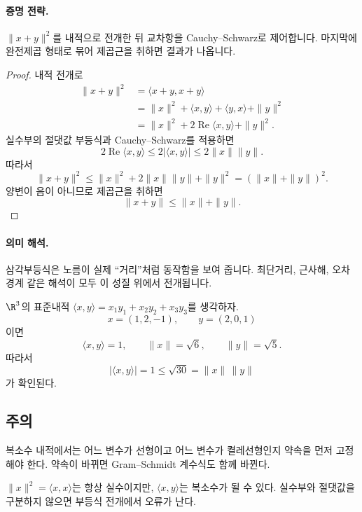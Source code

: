 \paragraph{증명 전략.}
$\|x+y\|^2$를 내적으로 전개한 뒤 교차항을 Cauchy--Schwarz로 제어합니다. 마지막에 완전제곱 형태로 묶어 제곱근을 취하면 결과가 나옵니다.

\begin{proof}
내적 전개로
\begin{align*}
\|x+y\|^2
&=\langle x+y,x+y\rangle\\
&=\|x\|^2+\langle x,y\rangle+\langle y,x\rangle+\|y\|^2\\
&=\|x\|^2+2\operatorname{Re}\langle x,y\rangle+\|y\|^2.
\end{align*}
실수부의 절댓값 부등식과 Cauchy--Schwarz를 적용하면
$$
2\operatorname{Re}\langle x,y\rangle
\le 2|\langle x,y\rangle|
\le 2\|x\|\|y\|.
$$
따라서
$$
\|x+y\|^2\le \|x\|^2+2\|x\|\|y\|+\|y\|^2=(\|x\|+\|y\|)^2.
$$
양변이 음이 아니므로 제곱근을 취하면
$$
\|x+y\|\le \|x\|+\|y\|.
$$
\end{proof}

\paragraph{의미 해석.}
삼각부등식은 노름이 실제 ``거리''처럼 동작함을 보여 줍니다. 최단거리, 근사해, 오차경계 같은 해석이 모두 이 성질 위에서 전개됩니다.

\begin{example}
$\R^3$의 표준내적 $\langle x,y\rangle=x_1y_1+x_2y_2+x_3y_3$를 생각하자.
$$
x=(1,2,-1),\qquad y=(2,0,1)
$$
이면
$$
\langle x,y\rangle=1,\qquad
\|x\|=\sqrt6,\qquad
\|y\|=\sqrt5.
$$
따라서
$$
|\langle x,y\rangle|=1\le \sqrt{30}=\|x\|\,\|y\|
$$
가 확인된다.
\end{example}

\subsection*{주의}
\begin{warning}
복소수 내적에서는 어느 변수가 선형이고 어느 변수가 켤레선형인지 약속을 먼저 고정해야 한다. 약속이 바뀌면 Gram--Schmidt 계수식도 함께 바뀐다.
\end{warning}
\begin{warning}
$\|x\|^2=\langle x,x\rangle$는 항상 실수이지만, $\langle x,y\rangle$는 복소수가 될 수 있다. 실수부와 절댓값을 구분하지 않으면 부등식 전개에서 오류가 난다.
\end{warning}

